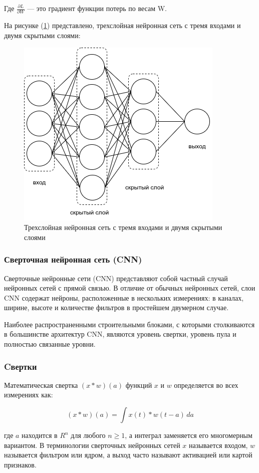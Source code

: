 Где \(\frac{\partial L}{\partial W}\) — это градиент функции потерь по весам W.

На рисунке (\ref{fig:neuron-arch}) представлено, трехслойная нейронная сеть с тремя входами и двумя скрытыми слоями: 
\begin{figure}[H]
	\centering
	\includegraphics[width=0.5\linewidth]{images/neural-arch.png}
	\caption{Трехслойная нейронная сеть с тремя входами и двумя скрытыми слоями}
	\label{fig:neuron-arch}
\end{figure}

\subsubsection{Сверточная нейронная сеть (CNN)}

Сверточные нейронные сети (CNN) представляют собой частный случай нейронных сетей с прямой связью. В отличие от обычных нейронных сетей, слои CNN содержат нейроны, расположенные в нескольких измерениях: в каналах, ширине, высоте и количестве фильтров в простейшем двумерном случае.

Наиболее распространенными строительными блоками, с которыми столкиваются в большинстве архитектур CNN, являются уровень свертки, уровень пула и полностью связанные уровни.

\subsubsection*{Cвертки}

Математическая свертка \((x * w)(a)\) функций \(x\) и \(w\) определяется во всех измерениях как:

\begin{equation}
    (x * w)(a) = \int x(t) * w (t - a) \, da
\end{equation}

где \(a\) находится в \(R^{n}\) для любого \(n \ge 1\), а интеграл заменяется его многомерным вариантом. В терминологии сверточных нейронных сетей \(x\) называется входом, \(w\) называется фильтром или ядром, а выход часто называют активацией или картой признаков.

